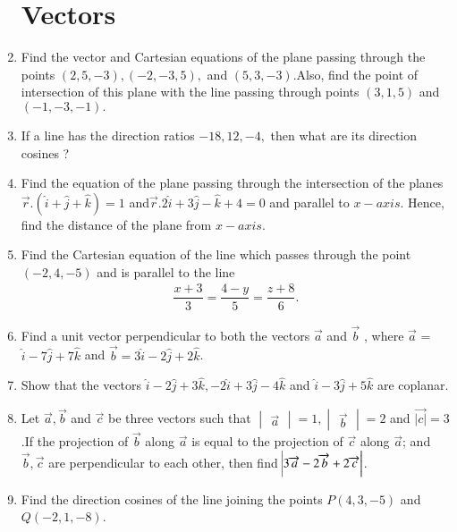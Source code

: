 \documentclass[12pt,-letter paper]{article}
\providecommand{\mydet}[1]{\ensuremath{\begin{vmatrix}#1\end{vmatrix}}}
\providecommand{\brak}[1]{\ensuremath{\left(#1\right)}}
\begin{document}
\begin{enumerate}
\section{Vectors}

\item Find the vector and Cartesian equations of the plane passing through the points $\brak{2,5,-3},\brak{-2,-3,5},$ and $\brak{5,3,-3}$.Also, find the point of intersection of this plane with the line passing through points $\brak{3,1,5} $ and $\brak{-1,-3,-1}.$

\item If a line has the direction ratios $-18, 12, -4,$ then what are its direction cosines ? 

\item Find the equation of the plane passing through the intersection of the planes $\overrightarrow r.\brak{\hat{i}+\hat{j}+\hat{k}}=1 $ and$\overrightarrow  r .2\hat{i}+3\hat{j}-\hat{k}+4=0 $ and parallel to $x-axis$. Hence, find the distance of the plane from $x-axis$.

\item Find the Cartesian equation of the line which passes through the point $\brak{- 2, 4,-5}$ and is parallel to the line 
\begin{align*}
\dfrac{x+3}{3}=\dfrac{4-y}{5}=\dfrac{z+8}{6}.
\end{align*}

\item Find a unit vector perpendicular to both the vectors 
$ \overrightarrow a $ and $ \overrightarrow b $ , where $ \overrightarrow a $ = $\hat{i} -7\hat{j} +7\hat{k}$ and $ \overrightarrow b = 3 \hat{i} -2 \hat{j}+ 2 \hat{k}$.

\item Show that the vectors $\hat{i} -2 \hat{j}+ 3 \hat{k},-2 \hat{i}+ 3  \hat{j} -4 \hat{k}$ and $\hat{i} -3 \hat{j}+ 5 \hat{k}$ are coplanar.

\item Let  $ \overrightarrow a ,\overrightarrow b$ and $\overrightarrow c $ be three vectors such that $\mydet{\overrightarrow{a}}  = 1 ,\mydet{\overrightarrow{b}}= 2$ and $\overrightarrow{|c|} =3$ .If the projection of $\overrightarrow b $ along $\overrightarrow a $ is equal to the projection of $\overrightarrow c $ along $ \overrightarrow a $; and $\overrightarrow b,\overrightarrow c $ are perpendicular to each other, then find $\abs{3\overrightarrow a-2\overrightarrow b +2\overrightarrow c}$.

\item Find the direction cosines of the line joining the points $P \brak{4, 3, -5}$ and $Q  \brak{-2, 1, -8}$.


\end{enumerate}
\end{document}
